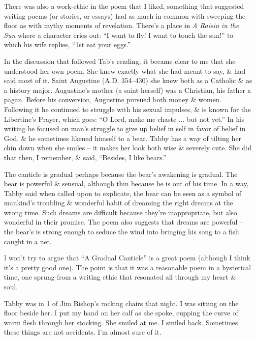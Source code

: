 \documentclass{article}
\numberwithin{equation}{section}
\begin{document}
There was also a work-ethic in the poem that I liked, something that suggested writing poems (or stories, or essays) had as much in common with sweeping the floor as with mythy moments of revelation. There's a place in \textit{A Raisin in the Sun} where a character cries out: ``I want to fly! I want to touch the sun!'' to which his wife replies, ``1st eat your eggs.''

In the discussion that followed Tab's reading, it became clear to me that she understood her own poem. She knew exactly what she had meant to say, \& had said most of it. Saint Augustine (A.D. 354--430) she knew both as a Catholic \& as a history major. Augustine's mother (a saint herself) was a Christian, his father a pagan. Before his conversion, Augustine pursued both money \& women. Following it he continued to struggle with his sexual impulses, \& is known for the Libertine's Prayer, which goes: ``O Lord, make me chaste $\ldots$ but not yet.'' In his writing he focused on man's struggle to give up belief in self in favor of belief in God. \& he sometimes likened himself to a bear. Tabby has a way of tilting her chin down when she smiles -- it makes her look both wise \& severely cute. She did that then, I remember, \& said, ``Besides, I like bears.''

The canticle is gradual perhaps because the bear's awakening is gradual. The bear is powerful \& sensual, although thin because he is out of his time. In a way, Tabby said when called upon to explicate, the bear can be seen as a symbol of mankind's troubling \& wonderful habit of dreaming the right dreams at the wrong time. Such dreams are difficult because they're inappropriate, but also wonderful in their promise. The poem also suggests that dreams are powerful -- the bear's is strong enough to seduce the wind into bringing his song to a fish caught in a net.

I won't try to argue that ``A Gradual Canticle'' is a great poem (although I think it's a pretty good one). The point is that it was a reasonable poem in a hysterical time, one sprung from a writing ethic that resonated all through my heart \& soul.

Tabby was in 1 of Jim Bishop's rocking chairs that night. I was sitting on the floor beside her. I put my hand on her calf as she spoke, cupping the curve of warm flesh through her stocking. She smiled at me. I smiled back. Sometimes these things are not accidents. I'm almost sure of it.
\end{document}
